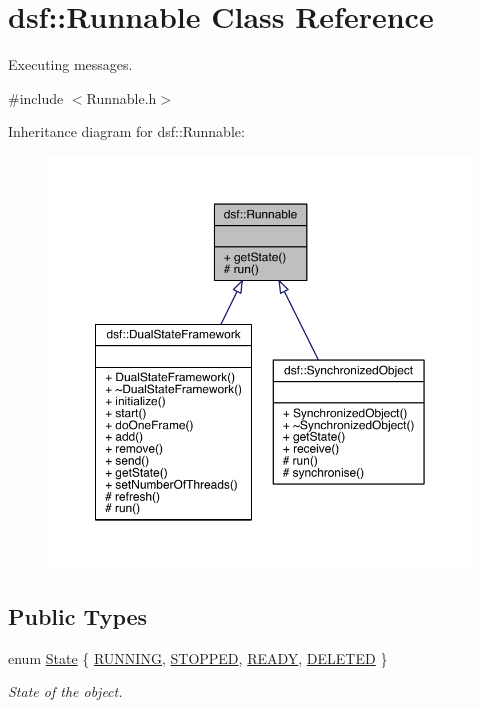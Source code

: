 \hypertarget{classdsf_1_1_runnable}{}\section{dsf\+:\+:Runnable Class Reference}
\label{classdsf_1_1_runnable}


Executing messages.  




{\ttfamily \#include $<$Runnable.\+h$>$}



Inheritance diagram for dsf\+:\+:Runnable\+:\nopagebreak
\begin{figure}[H]
\begin{center}
\leavevmode
\includegraphics[width=350pt]{classdsf_1_1_runnable__inherit__graph}
\end{center}
\end{figure}
\subsection*{Public Types}
\begin{DoxyCompactItemize}
\item 
enum \hyperlink{classdsf_1_1_runnable_a8eb63b21a0accc7a6a2a05f18e257991}{State} \{ \hyperlink{classdsf_1_1_runnable_a8eb63b21a0accc7a6a2a05f18e257991ad7167727fe5c31678c166aee6801ba0a}{R\+U\+N\+N\+I\+N\+G}, 
\hyperlink{classdsf_1_1_runnable_a8eb63b21a0accc7a6a2a05f18e257991a0897925165e6577c4d3ebb185178c9c5}{S\+T\+O\+P\+P\+E\+D}, 
\hyperlink{classdsf_1_1_runnable_a8eb63b21a0accc7a6a2a05f18e257991a60038f4f186bbe0d05fdbbe9da0f85de}{R\+E\+A\+D\+Y}, 
\hyperlink{classdsf_1_1_runnable_a8eb63b21a0accc7a6a2a05f18e257991aea5cfe327f95ca42d589e660b7cffe28}{D\+E\+L\+E\+T\+E\+D}
 \}
\begin{DoxyCompactList}\small\item\em State of the object. \end{DoxyCompactList}\end{DoxyCompactItemize}
